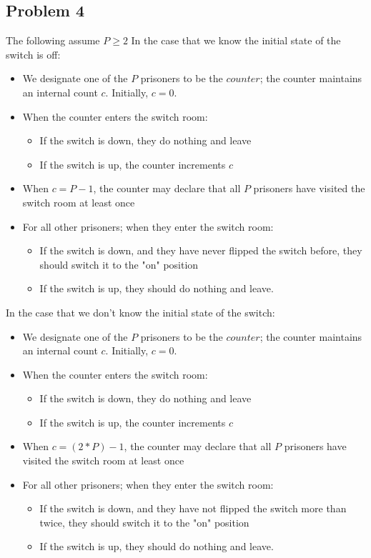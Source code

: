 \documentclass[]{article}
\begin{document}
\subsection{Problem 4}
The following assume $P \geq 2$
In the case that we know the initial state of the switch is off:
\begin{itemize}
	\item We designate one of the $P$ prisoners to be the $counter$; the counter maintains an internal count $c$. Initially, $c = 0$.
	\item When the counter enters the switch room:
	\begin{itemize}
		\item If the switch is down, they do nothing and leave
		\item If the switch is up, the counter increments $c$
	\end{itemize}
	\item When $c = P - 1$, the counter may declare that all $P$ prisoners have visited the switch room at least once
	\item For all other prisoners; when they enter the switch room:
	\begin{itemize}
		\item If the switch is down, and they have never flipped the switch before, they should switch it to the "on" position
		\item If the switch is up, they should do nothing and leave.
	\end{itemize}
\end{itemize}
In the case that we don't know the initial state of the switch:
\begin{itemize}
	\item We designate one of the $P$ prisoners to be the $counter$; the counter maintains an internal count $c$. Initially, $c = 0$.
	\item When the counter enters the switch room:
	\begin{itemize}
		\item If the switch is down, they do nothing and leave
		\item If the switch is up, the counter increments $c$
	\end{itemize}
	\item When $c = (2 * P) - 1$, the counter may declare that all $P$ prisoners have visited the switch room at least once
	\item For all other prisoners; when they enter the switch room:
	\begin{itemize}
		\item If the switch is down, and they have not flipped the switch more than twice, they should switch it to the "on" position
		\item If the switch is up, they should do nothing and leave.
	\end{itemize}
\end{itemize}
\end{document}
